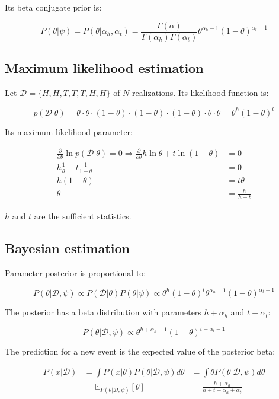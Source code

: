 	Its beta conjugate prior is:

	$$P(\theta|\psi) = P(\theta|\alpha_h, \alpha_t) = \frac{\Gamma(\alpha)}{\Gamma(\alpha_h)\Gamma(\alpha_t)}\theta^{\alpha_h-1}(1-\theta)^{\alpha_t-1}$$

	\subsection{Maximum likelihood estimation}
	Let $\mathcal{D} = \{H, H, T, T, T, H, H\}$ of $N$ realizations.
	Its likelihood function is:

	$$p(\mathcal{D}|\theta) = \theta\cdot\theta\cdot(1-\theta)\cdot(1-\theta)\cdot(1-\theta)\cdot\theta\cdot\theta = \theta^h(1-\theta)^t$$

	Its maximum likelihood parameter:

	\begin{align*}
		\frac{\partial}{\partial\theta}\ln p(\mathcal{D}|\theta) = 0\Rightarrow \frac{\partial}{\partial\theta}h\ln\theta + t\ln(1-\theta) &=0\\
		h\frac{1}{\theta}-t\frac{1}{1-\theta}&=0\\
		h(1-\theta) &= t\theta\\
		\theta &= \frac{h}{h+t}
	\end{align*}

	$h$ and $t$ are the sufficient statistics.

	\subsection{Bayesian estimation}
	Parameter posterior is proportional to:

	$$P(\theta|\mathcal{D}, \psi)\propto P(\mathcal{D}|\theta)P(\theta|\psi)\propto \theta^h(1-\theta)^t\theta^{\alpha_h-1}(1-\theta)^{\alpha_t-1}$$

	The posterior has a beta distribution with parameters $h+\alpha_h$ and $t+\alpha_t$:

	$$P(\theta|\mathcal{D}, \psi)\propto\theta^{h+\alpha_h-1}(1-\theta)^{t+\alpha_t-1}$$

	The prediction for a new event is the expected value of the posterior beta:

	\begin{align*}
		P(x|\mathcal{D}) &=\int P(x|\theta)P(\theta|\mathcal{D}, \psi)d\theta & = \int \theta P(\theta|\mathcal{D}, \psi)d\theta\\
										 &=\mathbb{E}_{P(\theta|\mathcal{D}, \psi)}[\theta] &= \frac{h+\alpha_h}{h+t+\alpha_h+\alpha_t}
	\end{align*}

